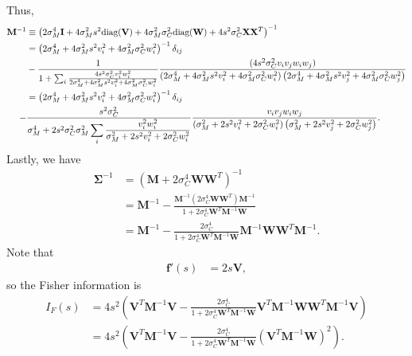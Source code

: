 \documentclass[11pt]{article}
\begin{document}
	Thus,
	\begin{align}
	\mathbf{M}^{-1} &\equiv \left(2\sigma_M^4 \mathbf{I} +4\sigma_M^2 s^2 \text{diag}(\mathbf{V}) + 4\sigma_M^2 \sigma_C^2 \text{diag}(\mathbf{W}) + 4s^2 \sigma_C^2 \mathbf{X}\mathbf{X}^T\right)^{-1} \\
	&= \left(2\sigma_M^4 + 4\sigma_M^2 s^2 v_i^2 + 4\sigma_M^2 \sigma_C^2 w_i^2\right)^{-1}\delta_{ij} \notag \\
	& - \frac{1}{1 + \sum_i\frac{4s^2\sigma_C^2 v_i^2 w_i^2}{2\sigma_M^4 + 4\sigma_M^2 s^2 v_i^2 + 4\sigma_M^2 \sigma_C^2 w_i^2}}\frac{(4s^2 \sigma_C^2 v_i v_j w_i w_j)}{\left(2\sigma_M^4 + 4\sigma_M^2 s^2 v_i^2 + 4\sigma_M^2 \sigma_C^2 w_i^2\right)\left(2\sigma_M^4 + 4\sigma_M^2 s^2 v_j^2 + 4\sigma_M^2 \sigma_C^2 w_j^2\right)}\notag \\
	&=  \left(2\sigma_M^4 + 4\sigma_M^2 s^2 v_i^2 + 4\sigma_M^2 \sigma_C^2 w_i^2\right)^{-1}\delta_{ij} \notag \\
	 - &\frac{s^2\sigma_C^2}{\sigma_M^4 +2s^2\sigma_C^2 \sigma_M^2\displaystyle\sum_i\frac{v_i^2 w_i^2}{\sigma_M^2+ 2s^2 v_i^2 + 2 \sigma_C^2 w_i^2}} \frac{ v_i v_j w_i w_j}{\left(\sigma_M^2 + 2s^2 v_i^2 + 2 \sigma_C^2 w_i^2\right)\left(\sigma_M^2 + 2 s^2 v_j^2 + 2\sigma_C^2 w_j^2\right)}.
	\end{align}
	Lastly, we have 
	\begin{align}
	\boldsymbol{\Sigma}^{-1} &= (\mathbf{M} + 2\sigma_C^4 \mathbf{W}\mathbf{W}^T)^{-1} \\
	&= \mathbf{M}^{-1} - \frac{\mathbf{M}^{-1} (2\sigma_C^4 \mathbf{W}\mathbf{W}^T) \mathbf{M}^{-1}}{1 + 2\sigma_C^4 \mathbf{W}^T\mathbf{M}^{-1}\mathbf{W}} \\
	&= \mathbf{M}^{-1} - \frac{2\sigma_C^4}{1 + 2\sigma_C^4 \mathbf{W}^T\mathbf{M}^{-1} \mathbf{W}} \mathbf{M}^{-1}\mathbf{W}\mathbf{W}^T\mathbf{M}^{-1}.
	\end{align}
	Note that
	\begin{align}
	\mathbf{f}'(s) &= 2 s \mathbf{V},
	\end{align}
	so the Fisher information is
	\begin{align}
	I_F(s) &= 4s^2 \left(\mathbf{V}^T \mathbf{M}^{-1} \mathbf{V} - \frac{2\sigma_C^4}{1 + 2\sigma_C^4 \mathbf{W}^T\mathbf{M}^{-1} \mathbf{W}} \mathbf{V}^T \mathbf{M}^{-1} \mathbf{W} \mathbf{W}^T \mathbf{M}^{-1}\mathbf{V}\right) \\
	&= 4s^2 \left(\mathbf{V}^T \mathbf{M}^{-1} \mathbf{V}-  \frac{2\sigma_C^4}{1 + 2\sigma_C^4 \mathbf{W}^T\mathbf{M}^{-1} \mathbf{W}} \left(\mathbf{V}^T\mathbf{M}^{-1} \mathbf{W}\right)^{2}\right).
	\end{align}
\end{document}
